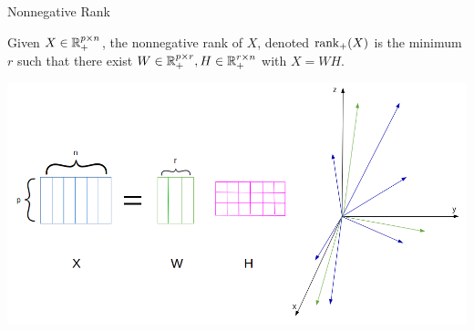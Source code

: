 \begin{frame}{Nonnegative Rank}
\begin{defn}
Given $X \in \mathbb{R}_+^{p\times n}$, the nonnegative rank of \(X\), denoted $\operatorname{rank}_+(X)$ is the minimum $r$ such that there exist $W \in \mathbb{R}_+^{p\times r}, H \in \mathbb{R}_+^{r\times n}$ with $X = WH$.
\end{defn}
\centering
\includegraphics[scale=0.28]{../images/NMFvect.png}
\end{frame}

